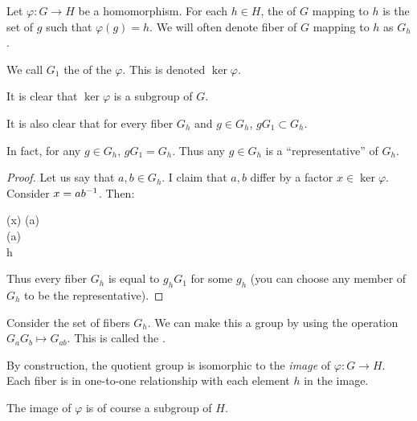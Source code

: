 \documentclass[11pt, oneside]{amsart}
\begin{document}
\begin{definition}
  Let $\varphi: G \to H$ be a homomorphism. For each $h\in H$, the
   of $G$ mapping to $h$ is the set of $g$ such that
  $\varphi(g) = h$. We will often denote fiber of $G$ mapping to $h$ as
  $G_h$.

  We call $G_1$ the  of the $\varphi$. This is denoted
  $\ker \varphi$.
\end{definition}

\begin{proposition}
  It is clear that $\ker \varphi$ is a subgroup of $G$.

  It is also clear that for every fiber $G_h$ and $g \in G_h$, $g G_1
  \subset G_h$.

  In fact, for any $g \in G_h$, $g G_1 = G_h$. Thus any $g \in G_h$ is a
  ``representative'' of $G_h$.
\end{proposition}

\begin{proof}
  Let us say that $a, b \in G_h$. I claim that $a, b$ differ by a
  factor $x \in \ker\varphi$. Consider $x = a {b}^{-1}$. Then:

  \begin{nedqn}
    \varphi(x)
  \eqcol
    \varphi(a) \varphi{}
  \\
  \eqcol
    \varphi(a) 
  \\
  \eqcol
    h 
  \\
  \end{nedqn}

  Thus every fiber $G_h$ is equal to $g_h G_1$ for some $g_h$ (you can
  choose any member of $G_h$ to be the representative).
\end{proof}

\begin{definition}
  Consider the set of fibers $G_h$. We can make this a group by using
  the operation $G_a G_b \mapsto G_{ab}$. This is called the
  .
\end{definition}

\begin{remark}
  By construction, the quotient group is isomorphic to the \emph{image}
  of $\varphi: G \to H$. Each fiber is in one-to-one relationship with
  each element $h$ in the image.

  The image of $\varphi$ is of course a subgroup of $H$.
\end{remark}
\end{document}
